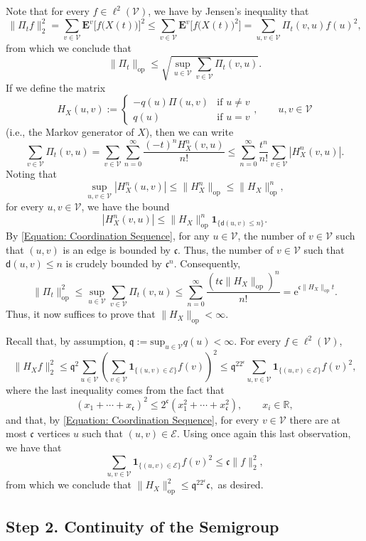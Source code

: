 \documentclass{amsart}
\numberwithin{equation}{section}
\theoremstyle{definition}
\newcommand\mbb{\mathbb}
\newcommand\mbf{\mathbf}
\newcommand\mf{\mathfrak}
\newcommand\mr{\mathrm}
\newcommand\ms{\mathscr}
\newcommand\msf{\mathsf}
\begin{document}
Note that for every $f\in\ell^2(\ms V)$, we have by Jensen's inequality that
\[\|\Pi_tf\|_{2}^2=\sum_{v\in\ms V}\mbf E^v\big[f\big(X(t)\big)\big]^2\leq\sum_{v\in\ms V}\mbf E^v\big[f\big(X(t)\big)^2\big]
=\sum_{u,v\in\ms V}\Pi_t(v,u)f(u)^2,\]
from which we conclude that
\[\|\Pi_t\|_{\mr{op}}\leq\sqrt{\sup_{u\in\ms V}\sum_{v\in\ms V}\Pi_t(v,u)}.\]
If we define the matrix
\[H_X(u,v):=\begin{cases}
-q(u)\Pi(u,v)&\text{if }u\neq v\\
q(u)&\text{if }u=v
\end{cases},\qquad u,v\in\ms V\]
(i.e., the Markov generator of $X$), then we can write
\[\sum_{v\in\ms V}\Pi_t(v,u)=\sum_{v\in\ms V}\sum_{n=0}^\infty\frac{(-t)^nH_X^n(v,u)}{n!}
\leq\sum_{n=0}^\infty\frac{t^n}{n!}\sum_{v\in\ms V}|H_X^n(v,u)|.\]
Noting that
\[\sup_{u,v\in\ms V}|H^n_X(u,v)|\leq\|H^n_X\|_{\mr{op}}\leq\|H_X\|^n_{\mr{op}},\]
for every $u,v\in\ms V$, we have the bound
\[|H_X^n(v,u)|\leq \|H_X\|^n_{\mr{op}}\mbf 1_{\{\msf d(u,v)\leq n\}}.\]
By \eqref{Equation: Coordination Sequence}, for any $u\in\ms V$,
the number of $v\in\ms V$ such that $(u,v)$ is an edge is bounded by $\mf c$.
Thus, the number of $v\in\ms V$ such that $\msf d(u,v)\leq n$ is crudely bounded by $\mf c^n$.
Consequently,
\[\|\Pi_t\|_{\mr{op}}^2\leq\sup_{u\in\ms V}\sum_{v\in\ms V}\Pi_t(v,u)\leq \sum_{n=0}^\infty\frac{(t\mf c\|H_X\|_{\mr{op}})^n}{n!}=\mr e^{\mf c\|H_X\|_{\mr{op}}t}.\]
Thus, it now suffices to prove that $\|H_X\|_{\mr{op}}<\infty$.

%

Recall that, by assumption, $\mf q:= \mathrm{sup}_{u\in \ms V} q(u)<\infty$. For every $f\in\ell^2(\ms V)$,
\[\|H_Xf\|_{2}^2\leq\mf q^2\sum_{u\in\ms V}\left(\sum_{v\in\ms V}\mbf 1_{\{(u,v)\in\ms E\}}f(v)\right)^2
\leq\mf q^22^{\mf c}\sum_{u,v\in\ms V}\mbf 1_{\{(u,v)\in\ms E\}}f(v)^2,\]
where the last inequality comes from the fact that
\[(x_1+\cdots+x_{\mf c})^2\leq2^{\mf c}(x_1^2+\cdots+x_{\mf c}^2),\qquad x_i\in\mbb R,\]
and that, by \eqref{Equation: Coordination Sequence},
for every $v\in\ms V$ there are at most $\mf c$ vertices $u$
such that $(u,v)\in\ms E$.
Using once again this last observation, we have that
\[\sum_{u,v\in\ms V}\mbf 1_{\{(u,v)\in\ms E\}}f(v)^2\leq\mf c\|f\|_2^2,\]
from which we conclude that
$\|H_X\|_{\mr{op}}^2\leq\mf q^22^{\mf c}\mf c,$
as desired.


%

\subsection{Step 2. Continuity of the Semigroup}
\end{document}

